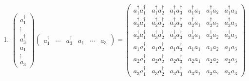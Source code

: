 \documentclass[aps,preprint]{revtex4}
\begin{document}
\begin{enumerate}
\item 
\begin{equation}
\left( 
\begin{array}{c}
a_{1}^{\dagger } \\ 
\vdots \\ 
a_{3}^{\dagger } \\ 
a_{1} \\ 
\vdots \\ 
a_{3}%
\end{array}%
\right) \left( 
\begin{array}{cccccc}
a_{1}^{\dagger } & \cdots & a_{3}^{\dagger } & a_{1} & \cdots & a_{3}%
\end{array}%
\right) =\left( 
\begin{array}{cccccc}
a_{1}^{\dagger }a_{1}^{\dagger } & a_{1}^{\dagger }a_{2}^{\dagger } & 
a_{1}^{\dagger }a_{3}^{\dagger } & a_{1}^{\dagger }a_{1} & a_{1}^{\dagger
}a_{2} & a_{1}^{\dagger }a_{3} \\ 
a_{2}^{\dagger }a_{1}^{\dagger } & a_{2}^{\dagger }a_{2}^{\dagger } & 
a_{2}^{\dagger }a_{3}^{\dagger } & a_{2}^{\dagger }a_{1} & a_{2}^{\dagger
}a_{2} & a_{2}^{\dagger }a_{3} \\ 
a_{3}^{\dagger }a_{1}^{\dagger } & a_{3}^{\dagger }a_{2}^{\dagger } & 
a_{3}^{\dagger }a_{3}^{\dagger } & a_{3}^{\dagger }a_{1} & a_{3}^{\dagger
}a_{2} & a_{3}^{\dagger }a_{3} \\ 
a_{1}a_{1}^{\dagger } & a_{1}a_{2}^{\dagger } & a_{1}a_{3}^{\dagger } & 
a_{1}a_{1} & a_{1}a_{2} & a_{1}a_{3} \\ 
a_{2}a_{1}^{\dagger } & a_{2}a_{2}^{\dagger } & a_{2}a_{3}^{\dagger } & 
a_{2}a_{1} & a_{2}a_{2} & a_{2}a_{3} \\ 
a_{3}a_{1}^{\dagger } & a_{3}a_{2}^{\dagger } & a_{3}a_{3}^{\dagger } & 
a_{3}a_{1} & a_{3}a_{2} & a_{3}a_{3}%
\end{array}%
\right)
\end{equation}


\end{enumerate}
\end{document}
